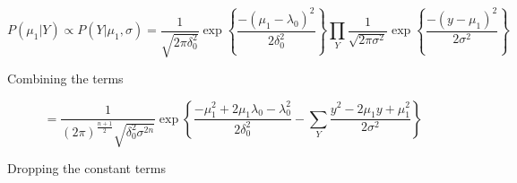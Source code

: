 \documentclass[12pt,a4paper,leqno]{report}
\theoremstyle{plain}
\theoremstyle{definition}
\theoremstyle{remark}
\begin{document}
\begin{def}\label{}
\begin{equation}\label{}
    P(\mu_1|Y)
    \propto
    P(Y|\mu_1, \sigma)
    =
    \frac{1}
    {{\sqrt {2\pi \delta_0^2} }}
    \exp{
        \left \{
            \frac{
            -(\mu_1 - \lambda_0)^2
            }
            {2\delta_0^2}
        \right \}
    }
    \prod_{Y}
    \frac{1}
    {{\sqrt {2\pi \sigma^2} }}
    \exp{
        \left \{
            \frac{-(y - \mu_1)^2}
            {2\sigma^2}
        \right \}
    }
\end{equation}
\end{def}Combining the terms
\begin{def}\label{}
\begin{equation}\label{}
    =
    \frac{1}
    {
        (2\pi)^{\frac{n+1}{2}}
        \sqrt{ \delta_0^2 \sigma^{2n}}
    }
    \exp{
        \left \{
            \frac{- \mu_1^2 + 2 \mu_1 \lambda_0 - \lambda_0^2}{2\delta_0^2}
            -
            \sum_{Y}
            \frac{y^2 - 2 \mu_1 y + \mu_1^2}{2\sigma^2}
        \right \}
    }
\end{equation}
\end{def}Dropping the constant terms
\end{document}
